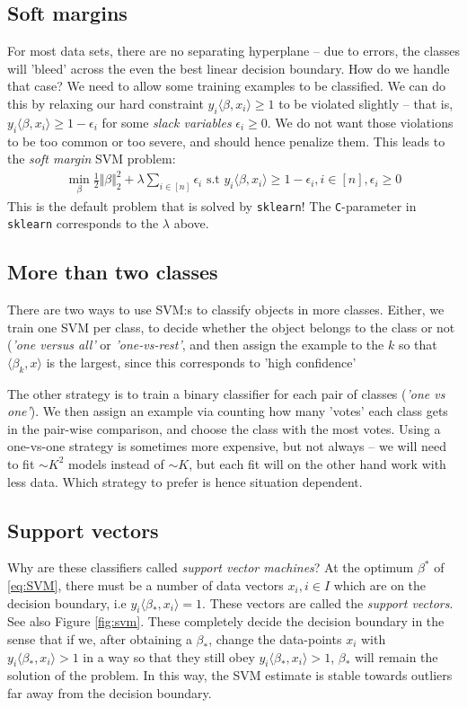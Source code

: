 \documentclass{article}
\newcommand{\sprod}[1]{\langle #1 \rangle}
\newcommand{\norm}[1]{\Vert #1 \Vert}
\begin{document}
\subsection{Soft margins} For most data sets, there are no separating hyperplane -- due to errors, the classes will 'bleed' across the even the best linear decision boundary. How do we handle that case? We need to allow some training examples to be classified. We can do this by relaxing our hard constraint $y_i \sprod{\beta,x_i}\geq 1$ to be violated slightly -- that is, $y_i\sprod{\beta,x_i}\geq 1 -\epsilon_i$ for some \emph{slack variables} $\epsilon_i\geq 0$. We do not want those violations to be too common or too severe, and should hence penalize them. This leads to the \emph{soft margin} SVM problem:
\begin{align}
    \min_\beta \tfrac{1}{2}\norm{\beta}_2^2 + \lambda \sum_{i\in [n]} \epsilon_i \text{ s.t } y_i\sprod{\beta,x_i}\geq 1-\epsilon_i, i \in [n] , \epsilon_i \geq 0\label{eq:SVMsoft}
\end{align}
This is the default problem that is solved by \texttt{sklearn}! The \texttt{C}-parameter in \texttt{sklearn} corresponds to the $\lambda$ above. 

\subsection{More than two classes} There are two ways to use SVM:s to classify objects in more classes. Either, we train one SVM per class, to decide whether the object belongs to the class or not (\emph{'one versus all'} or \emph{'one-vs-rest'}, and then assign the example to the $k$ so that $\sprod{\beta_k,x}$ is the largest, since this corresponds to 'high confidence' 

The other strategy is to train a binary classifier for each pair of classes (\emph{'one vs one'}). We then assign an example via counting how many 'votes' each class gets in the pair-wise comparison, and choose the class with the most votes. Using a one-vs-one strategy is sometimes more expensive, but not always -- we will need to fit $\sim K^2$ models instead of $\sim K$, but each fit will on the other hand work with less data. Which strategy to prefer is hence situation dependent.

\subsection{Support vectors}
Why are these classifiers called \emph{support vector machines}? At the optimum $\beta^*$ of \eqref{eq:SVM}, there must be a number of data vectors $x_i, i\in I$ which are on the decision boundary, i.e  $y_i\sprod{\beta_*,x_i}=1$. These vectors are called the \emph{support vectors}. See also Figure \ref{fig:svm}. These completely decide the decision boundary in the sense that if we, after obtaining a $\beta_*$, change the data-points $x_i$ with $y_i \sprod{\beta_*,x_i}>1$ in a way so that they still obey $y_i \sprod{\beta_*,x_i}>1$, $\beta_*$ will remain the solution of the problem. In this way, the SVM estimate is stable towards outliers far away from the decision boundary.
\end{document}
